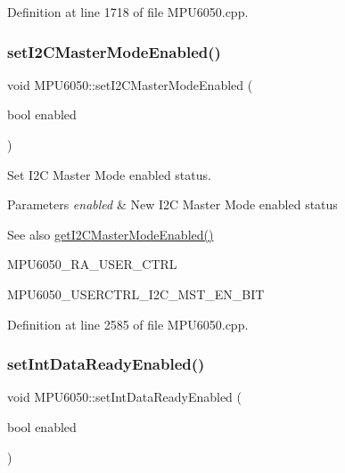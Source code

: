 Definition at line 1718 of file M\+P\+U6050.\+cpp.

\mbox{\label{classMPU6050_a6503f0fdfefa0fd287a75032667b7b69}} 
\subsubsection{\texorpdfstring{setI2CMasterModeEnabled()}{setI2CMasterModeEnabled()}}
{\footnotesize\ttfamily void M\+P\+U6050\+::set\+I2\+C\+Master\+Mode\+Enabled (\begin{DoxyParamCaption}\item[{bool}]{enabled }\end{DoxyParamCaption})}



Set I2C Master Mode enabled status. 


\begin{DoxyParams}{Parameters}
{\em enabled} & New I2C Master Mode enabled status \\
\hline
\end{DoxyParams}
\begin{DoxySeeAlso}{See also}
\mbox{\hyperlink{classMPU6050_a6b45e538f2082eb1b1975ed56e3e21bc}{get\+I2\+C\+Master\+Mode\+Enabled()}} 

M\+P\+U6050\+\_\+\+R\+A\+\_\+\+U\+S\+E\+R\+\_\+\+C\+T\+RL 

M\+P\+U6050\+\_\+\+U\+S\+E\+R\+C\+T\+R\+L\+\_\+\+I2\+C\+\_\+\+M\+S\+T\+\_\+\+E\+N\+\_\+\+B\+IT 
\end{DoxySeeAlso}


Definition at line 2585 of file M\+P\+U6050.\+cpp.

\mbox{\label{classMPU6050_a67a11be7fc7ab6b1186469b94ea33dda}} 
\subsubsection{\texorpdfstring{setIntDataReadyEnabled()}{setIntDataReadyEnabled()}}
{\footnotesize\ttfamily void M\+P\+U6050\+::set\+Int\+Data\+Ready\+Enabled (\begin{DoxyParamCaption}\item[{bool}]{enabled }\end{DoxyParamCaption})}



